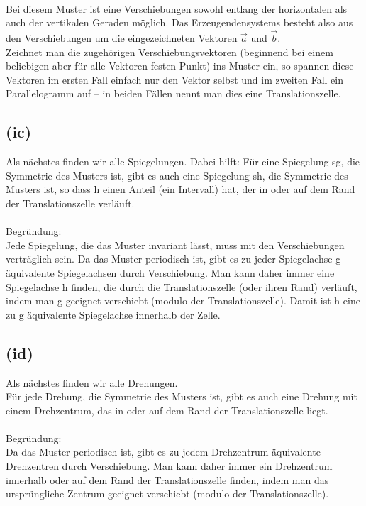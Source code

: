 \documentclass[12pt,a4paper]{article}
\begin{document}
\\
Bei diesem Muster ist eine Verschiebungen sowohl entlang der horizontalen als auch der vertikalen Geraden möglich. Das Erzeugendensystems besteht also aus den Verschiebungen um die eingezeichneten Vektoren $\vec{a}$ und $\vec{b}$.\\
Zeichnet man die zugehörigen Verschiebungsvektoren (beginnend bei einem beliebigen aber für alle Vektoren festen Punkt) ins Muster ein, so spannen diese Vektoren im ersten Fall einfach nur den Vektor selbst und im zweiten Fall ein Parallelogramm auf – in beiden Fällen nennt man dies eine Translationszelle.

\subsection*{(ic)}
\noindent Als nächstes finden wir alle Spiegelungen. Dabei hilft: Für eine Spiegelung sg, die Symmetrie des Musters ist, gibt es auch eine Spiegelung sh, die Symmetrie des Musters ist, so dass h einen Anteil (ein Intervall) hat, der in oder auf dem Rand der Translationszelle verläuft.\\
\\
Begründung:\\
Jede Spiegelung, die das Muster invariant lässt, muss mit den Verschiebungen verträglich sein. Da das Muster periodisch ist, gibt es zu jeder Spiegelachse g äquivalente Spiegelachsen durch Verschiebung. Man kann daher immer eine Spiegelachse h finden, die durch die Translationszelle (oder ihren Rand) verläuft, indem man g geeignet verschiebt (modulo der Translationszelle). Damit ist h eine zu g äquivalente Spiegelachse innerhalb der Zelle.

\subsection*{(id)}
Als nächstes finden wir alle Drehungen.\\
Für jede Drehung, die Symmetrie des Musters ist, gibt es auch eine Drehung mit einem Drehzentrum, das in oder auf dem Rand der Translationszelle liegt.\\
\\
Begründung:\\
Da das Muster periodisch ist, gibt es zu jedem Drehzentrum äquivalente Drehzentren durch Verschiebung. Man kann daher immer ein Drehzentrum innerhalb oder auf dem Rand der Translationszelle finden, indem man das ursprüngliche Zentrum geeignet verschiebt (modulo der Translationszelle).
\end{document}
